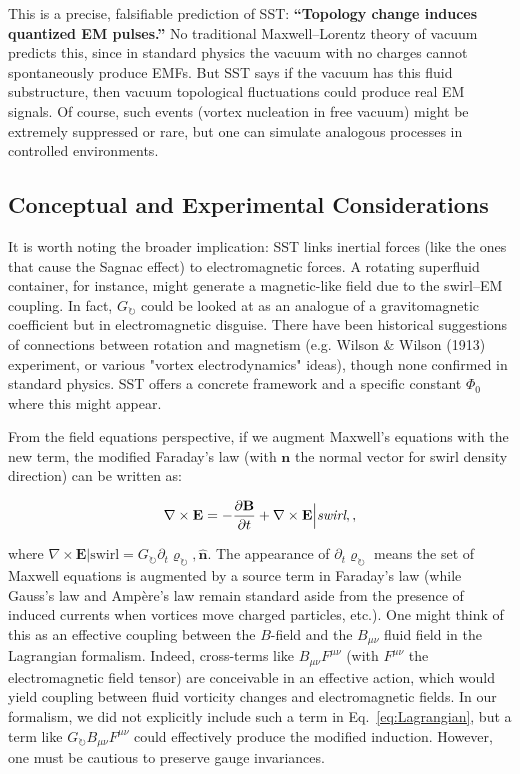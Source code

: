 \documentclass[10pt,reprint,aps,onecolumn,nofootinbib]{revtex4-2}
\begin{document}
This is a precise, falsifiable prediction of SST: \textbf{``Topology change induces quantized EM pulses.''} No traditional Maxwell–Lorentz theory of vacuum predicts this, since in standard physics the vacuum with no charges cannot spontaneously produce EMFs. But SST says if the vacuum has this fluid substructure, then vacuum topological fluctuations could produce real EM signals. Of course, such events (vortex nucleation in free vacuum) might be extremely suppressed or rare, but one can simulate analogous processes in controlled environments.


\subsection{Conceptual and Experimental Considerations}

It is worth noting the broader implication: SST links inertial forces (like the ones that cause the Sagnac effect) to electromagnetic forces. A rotating superfluid container, for instance, might generate a magnetic-like field due to the swirl–EM coupling. In fact, $G_{\circlearrowright}$ could be looked at as an analogue of a gravitomagnetic coefficient but in electromagnetic disguise. There have been historical suggestions of connections between rotation and magnetism (e.g. Wilson \& Wilson (1913) experiment, or various "vortex electrodynamics" ideas), though none confirmed in standard physics. SST offers a concrete framework and a specific constant $\Phi_0$ where this might appear.


From the field equations perspective, if we augment Maxwell’s equations with the new term, the modified Faraday’s law (with $\mathbf{n}$ the normal vector for swirl density direction) can be written as:

\begin{equation}

\nabla \times \mathbf{E} = -\frac{\partial \mathbf{B}}{ \partial t} + \nabla \times \mathbf{E}\Big|\textit{\text{swirl}},,

\end{equation}

where $\nabla \times \mathbf{E}|{\text{swirl}} = G_{\circlearrowright} \partial_t \varrho_{\circlearrowright}, \mathbf{\hat{n}}$. The appearance of $\partial_t \varrho_{\circlearrowright}$ means the set of Maxwell equations is augmented by a source term in Faraday’s law (while Gauss’s law and Ampère’s law remain standard aside from the presence of induced currents when vortices move charged particles, etc.). One might think of this as an effective coupling between the $B$-field and the $B_{\mu\nu}$ fluid field in the Lagrangian formalism. Indeed, cross-terms like $B_{\mu\nu}F^{\mu\nu}$ (with $F^{\mu\nu}$ the electromagnetic field tensor) are conceivable in an effective action, which would yield coupling between fluid vorticity changes and electromagnetic fields. In our formalism, we did not explicitly include such a term in Eq.~\eqref{eq:Lagrangian}, but a term like $G_{\circlearrowright} B_{\mu\nu} F^{\mu\nu}$ could effectively produce the modified induction. However, one must be cautious to preserve gauge invariances.
\end{document}
